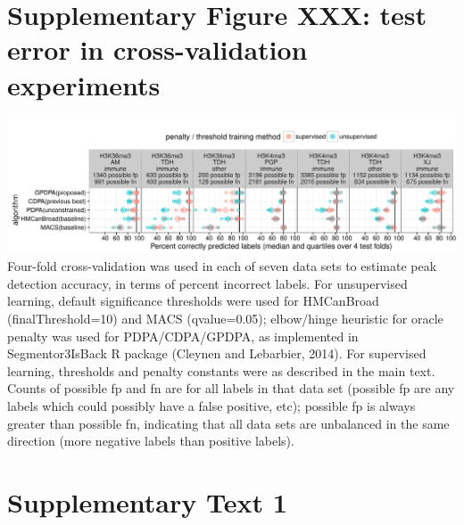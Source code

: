 \documentclass{article}
\begin{document}
\section*{Supplementary Figure XXX: test error in cross-validation experiments}
\includegraphics[width=\textwidth]{figure-test-error-dots-supp}
Four-fold cross-validation was used in each of seven data sets to
estimate peak detection accuracy, in terms of percent incorrect
labels. For unsupervised learning, default significance thresholds
were used for HMCanBroad (finalThreshold=10) and MACS (qvalue=0.05);
elbow/hinge heuristic for oracle penalty was used for PDPA/CDPA/GPDPA,
as implemented in Segmentor3IsBack R package (Cleynen and Lebarbier,
2014). For supervised learning, thresholds and penalty constants were
as described in the main text. Counts of possible fp and fn are for
all labels in that data set (possible fp are any labels which could
possibly have a false positive, etc); possible fp is always greater
than possible fn, indicating that all data sets are unbalanced in the
same direction (more negative labels than positive labels).

\newpage


\section{Supplementary Text 1}
\end{document}
